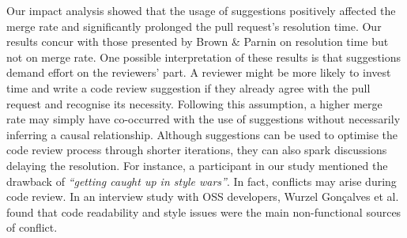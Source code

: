 Our impact analysis showed that the usage of suggestions positively affected the merge rate and significantly prolonged the pull request's resolution time.
Our results concur with those presented by Brown \& Parnin \cite{Brown_Suggestions_2020} on resolution time but not on merge rate.
One possible interpretation of these results is that suggestions demand effort on the reviewers' part.
A reviewer might be more likely to invest time and write a code review suggestion if they already agree with the pull request and recognise its necessity. 
Following this assumption, a higher merge rate may simply have co-occurred with the use of suggestions without necessarily inferring a causal relationship.
Although suggestions can be used to optimise the code review process through shorter iterations, they can also spark discussions delaying the resolution.
For instance, a participant in our study mentioned the drawback of \textit{``getting caught up in style wars''}.
In fact, conflicts may arise during code review.
In an interview study with OSS developers, Wurzel Gon{\c{c}}alves et al.~\cite{wurzel2022interpersonal} found that code readability and style issues were the main non-functional sources of conflict.



